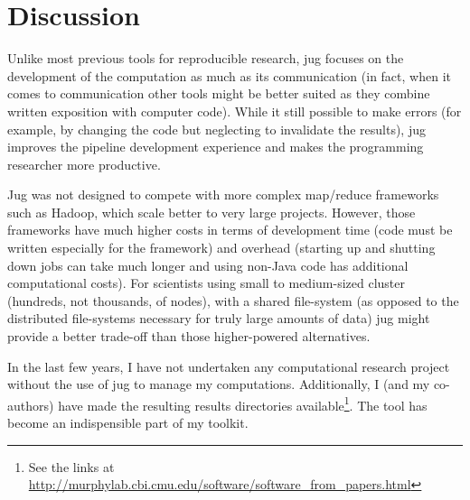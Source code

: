 \documentclass{article}
\begin{document}
\section{Discussion}
Unlike most previous tools for reproducible research, jug focuses on the
development of the computation as much as its communication (in fact, when it
comes to communication other tools might be better suited as they combine
written exposition with computer code). While it still possible to make errors
(for example, by changing the code but neglecting to invalidate the results),
jug improves the pipeline development experience and makes the programming
researcher more productive.

Jug was not designed to compete with more complex map/reduce frameworks such as
Hadoop, which scale better to very large projects. However, those frameworks
have much higher costs in terms of development time (code must be written
especially for the framework) and overhead (starting up and shutting down jobs
can take much longer and using non-Java code has additional computational
costs). For scientists using small to medium-sized cluster (hundreds, not
thousands, of nodes), with a shared file-system (as opposed to the distributed
file-systems necessary for truly large amounts of data) jug might provide a
better trade-off  than those higher-powered alternatives.

In the last few years, I have not undertaken any computational research project
without the use of jug to manage my computations. Additionally, I (and my
co-authors) have made the resulting results directories available\footnote{See
the links at
\url{http://murphylab.cbi.cmu.edu/software/software_from_papers.html}}. The
tool has become an indispensible part of my toolkit.
\end{document}
